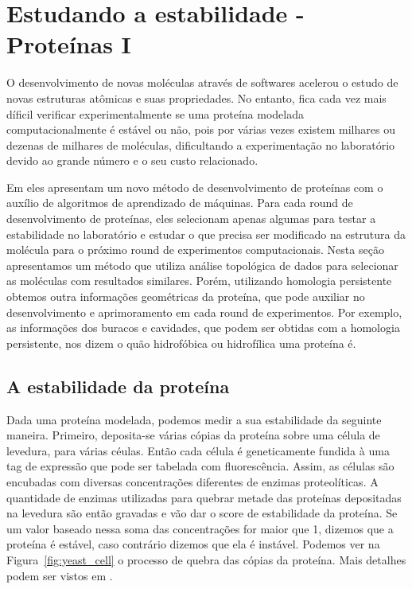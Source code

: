 \section{Estudando a estabilidade - Proteínas I}\label{sec:stabprot}

O desenvolvimento de novas moléculas através de softwares acelerou o estudo de 
novas estruturas atômicas e suas propriedades. No entanto, fica cada vez mais díficil
verificar experimentalmente se uma proteína modelada computacionalmente é estável ou não,
pois por várias vezes existem milhares ou dezenas de milhares de moléculas, dificultando
a experimentação no laboratório devido ao grande número e o seu custo relacionado.

Em \cite{Rocklin2017} eles apresentam um novo método de desenvolvimento de proteínas
com o auxílio de algoritmos de aprendizado de máquinas. Para cada round de desenvolvimento
de proteínas, eles selecionam apenas algumas para testar a estabilidade no laboratório e 
estudar o que precisa ser modificado na estrutura da molécula para o próximo round de 
experimentos computacionais. Nesta seção apresentamos um método que utiliza 
análise topológica de dados para selecionar as moléculas com resultados similares. Porém, 
utilizando homologia persistente obtemos outra informações geométricas da proteína, que pode
auxiliar no desenvolvimento e aprimoramento em cada round de experimentos. Por exemplo, as informações 
dos buracos e cavidades, que podem ser obtidas com a homologia persistente, nos dizem o quão hidrofóbica 
ou hidrofílica uma proteína é. \cite{Jamadagni2011} 

\subsection{A estabilidade da proteína}
Dada uma proteína modelada, podemos medir a sua estabilidade da seguinte maneira. Primeiro,
deposita-se várias cópias da proteína sobre uma célula de levedura, para várias céulas. Então cada 
célula é geneticamente fundida à uma tag de expressão que pode ser tabelada com fluorescência. 
Assim, as células são encubadas com diversas concentrações diferentes de enzimas proteolíticas. 
A quantidade de enzimas utilizadas para quebrar metade das proteínas depositadas na levedura
são então gravadas e vão dar o score de estabilidade da proteína. Se um valor baseado 
nessa soma das concentrações for maior que 1, dizemos que a proteína é estável, caso contrário
dizemos que ela é instável. Podemos ver na Figura~\ref{fig:yeast_cell} o processo de quebra
das cópias da proteína. Mais detalhes podem ser vistos em \cite{Rocklin2017}.

